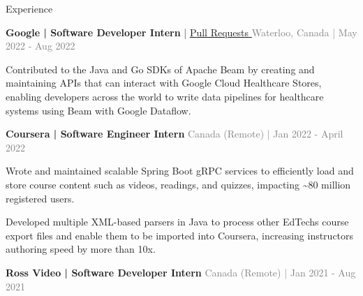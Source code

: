 \documentclass[hidelinks]{resume} %
\begin{document}
\vspace{-.20cm}
\begin{rSection}{Experience}
\vspace{-.1cm}
\begin{rSubsection}{\textbf{Google | Software Developer Intern} |
\href{https://github.com/apache/beam/pulls?q=state\%3Amerged+author\%3Alnogueir}{\underline{Pull Requests} \faGithub} }{\textcolor{gray}{\small Waterloo, Canada | May 2022 - Aug 2022}}{}
        \par
        \begin{bulletpoints}
            \vspace{-.07cm}
            \item Contributed to the Java and Go SDKs of Apache Beam by creating and maintaining APIs that can interact with Google Cloud Healthcare Stores, enabling developers across the world to write data pipelines for healthcare systems using Beam with Google Dataflow.
             \vspace{-.13cm}
        \end{bulletpoints}
\end{rSubsection}
\begin{rSubsection}{\textbf{Coursera | Software Engineer Intern} }{\textcolor{gray}{\small Canada (Remote) | Jan 2022 - April 2022}}{}

    \begin{bulletpoints}
        \vspace{-.07cm}
        \item Wrote and maintained scalable Spring Boot gRPC services to efficiently load and store course content such as videos, readings, and quizzes, impacting \textasciitilde 80 million registered users.
        \vspace{-.13cm}
        \item Developed multiple XML-based parsers in Java to process other EdTechs course export files and enable them to be imported into Coursera, increasing instructors authoring speed by more than 10x.
        \vspace{-.13cm}
    \end{bulletpoints}
\end{rSubsection}
\begin{rSubsection}{\textbf{Ross Video | Software Developer Intern} }{\textcolor{gray}{\small Canada (Remote) | Jan 2021 - Aug 2021}}{}


\end{rSubsection}
\end{rSection}
\end{document}

